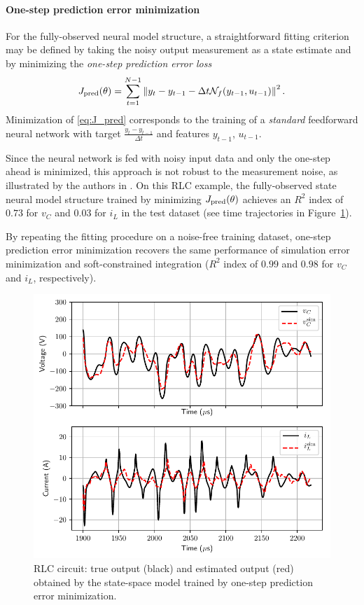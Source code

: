 \documentclass{article} %
\newcommand{\NN}{\mathcal{N}} %
\newcommand{\nsamp}{N}
\newcommand{\norm}[1]{\left\lVert#1\right\rVert}
\begin{document}
\paragraph{One-step prediction error minimization}
For the fully-observed neural model structure, a straightforward fitting criterion may be defined by taking the noisy output measurement as a state estimate and by minimizing the \emph{one-step prediction error loss}
\begin{equation}
\label{eq:J_pred}
 J_{\rm pred}(\theta) = \sum_{t=1}^{\nsamp-1} \norm{y_{t} - y_{t-1} - \Delta t \NN_f({y_{t-1}, u_{t-1}})}^2.
\end{equation}
Minimization of \eqref{eq:J_pred} corresponds to the training of a \emph{standard} feedforward neural network with target $\frac{y_{t} - y_{t-1}}{\Delta t}$ and features $y_{t-1}$, $u_{t-1}$.

Since the neural network is fed with noisy input data and only the one-step ahead is minimized, this approach is not robust to the measurement noise, as illustrated by the authors in \citep{forgione20Uz}.
On this RLC example, the fully-observed state neural model structure trained by minimizing $J_{\rm pred}(\theta)$ achieves an $R^2$ index of $0.73$ for $v_C$ and $0.03$ for $i_L$ in the test dataset (see time trajectories in Figure~\ref{fig:RLC_SS_val_1step_noise}).

By repeating the fitting procedure on a noise-free training dataset, one-step prediction error minimization recovers the same performance of simulation error minimization and soft-constrained integration ($R^2$ index of $0.99$ and $0.98$ for $v_C$ and $i_L$, respectively).
\begin{figure}[!t]
\centering
   \includegraphics[width=.75\linewidth]{fig/RLC/RLC_SS_val_1step_noise.pdf}
\caption{RLC circuit: true output (black) and  estimated output (red) obtained by the state-space model trained by one-step prediction error minimization.}
\label{fig:RLC_SS_val_1step_noise}
\end{figure}
\end{document}
